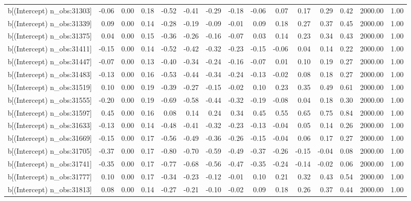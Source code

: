 \begin{table}[ht]
\begin{tabular}{rrrrrrrrrrrrrrr}
  b[(Intercept) n\_obs:31303] & -0.06 & 0.00 & 0.18 & -0.52 & -0.41 & -0.29 & -0.18 & -0.06 & 0.07 & 0.17 & 0.29 & 0.42 & 2000.00 & 1.00 \\ 
  b[(Intercept) n\_obs:31339] & 0.09 & 0.00 & 0.14 & -0.28 & -0.19 & -0.09 & -0.01 & 0.09 & 0.18 & 0.27 & 0.37 & 0.45 & 2000.00 & 1.00 \\ 
  b[(Intercept) n\_obs:31375] & 0.04 & 0.00 & 0.15 & -0.36 & -0.26 & -0.16 & -0.07 & 0.03 & 0.14 & 0.23 & 0.34 & 0.43 & 2000.00 & 1.00 \\ 
  b[(Intercept) n\_obs:31411] & -0.15 & 0.00 & 0.14 & -0.52 & -0.42 & -0.32 & -0.23 & -0.15 & -0.06 & 0.04 & 0.14 & 0.22 & 2000.00 & 1.00 \\ 
  b[(Intercept) n\_obs:31447] & -0.07 & 0.00 & 0.13 & -0.40 & -0.34 & -0.24 & -0.16 & -0.07 & 0.01 & 0.10 & 0.19 & 0.27 & 2000.00 & 1.00 \\ 
  b[(Intercept) n\_obs:31483] & -0.13 & 0.00 & 0.16 & -0.53 & -0.44 & -0.34 & -0.24 & -0.13 & -0.02 & 0.08 & 0.18 & 0.27 & 2000.00 & 1.00 \\ 
  b[(Intercept) n\_obs:31519] & 0.10 & 0.00 & 0.19 & -0.39 & -0.27 & -0.15 & -0.02 & 0.10 & 0.23 & 0.35 & 0.49 & 0.61 & 2000.00 & 1.00 \\ 
  b[(Intercept) n\_obs:31555] & -0.20 & 0.00 & 0.19 & -0.69 & -0.58 & -0.44 & -0.32 & -0.19 & -0.08 & 0.04 & 0.18 & 0.30 & 2000.00 & 1.00 \\ 
  b[(Intercept) n\_obs:31597] & 0.45 & 0.00 & 0.16 & 0.08 & 0.14 & 0.24 & 0.34 & 0.45 & 0.55 & 0.65 & 0.75 & 0.84 & 2000.00 & 1.00 \\ 
  b[(Intercept) n\_obs:31633] & -0.13 & 0.00 & 0.14 & -0.48 & -0.41 & -0.32 & -0.23 & -0.13 & -0.04 & 0.05 & 0.14 & 0.26 & 2000.00 & 1.00 \\ 
  b[(Intercept) n\_obs:31669] & -0.15 & 0.00 & 0.17 & -0.56 & -0.49 & -0.36 & -0.26 & -0.15 & -0.04 & 0.06 & 0.17 & 0.27 & 2000.00 & 1.00 \\ 
  b[(Intercept) n\_obs:31705] & -0.37 & 0.00 & 0.17 & -0.80 & -0.70 & -0.59 & -0.49 & -0.37 & -0.26 & -0.15 & -0.04 & 0.08 & 2000.00 & 1.00 \\ 
  b[(Intercept) n\_obs:31741] & -0.35 & 0.00 & 0.17 & -0.77 & -0.68 & -0.56 & -0.47 & -0.35 & -0.24 & -0.14 & -0.02 & 0.06 & 2000.00 & 1.00 \\ 
  b[(Intercept) n\_obs:31777] & 0.10 & 0.00 & 0.17 & -0.34 & -0.23 & -0.12 & -0.01 & 0.10 & 0.21 & 0.32 & 0.43 & 0.54 & 2000.00 & 1.00 \\ 
  b[(Intercept) n\_obs:31813] & 0.08 & 0.00 & 0.14 & -0.27 & -0.21 & -0.10 & -0.02 & 0.09 & 0.18 & 0.26 & 0.37 & 0.44 & 2000.00 & 1.00 \\ 

\end{tabular}
\end{table}
